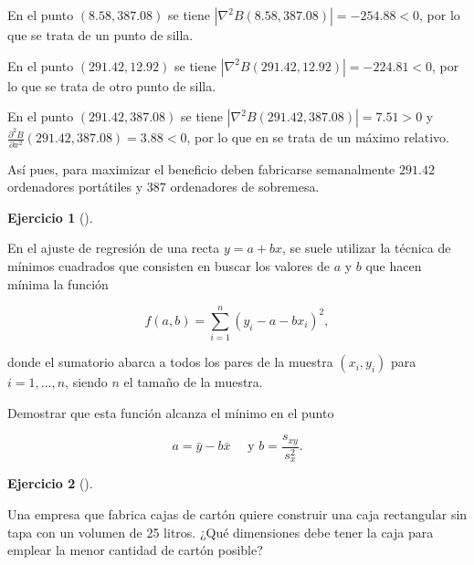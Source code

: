 \documentclass[
  a4paper,
]{scrreport}
\theoremstyle{definition}
\newtheorem{exercise}{Ejercicio}[chapter]
\theoremstyle{remark}
\begin{document}
\begin{tcolorbox}
En el punto \((8.58, 387.08)\) se tiene
\(|\nabla^2B(8.58, 387.08)| = -254.88 <0\), por lo que se trata de un
punto de silla.

En el punto \((291.42, 12.92)\) se tiene
\(|\nabla^2B(291.42, 12.92)| = -224.81 <0\), por lo que se trata de otro
punto de silla.

En el punto \((291.42, 387.08)\) se tiene
\(|\nabla^2B(291.42, 387.08)| = 7.51 >0\) y
\(\frac{\partial ^2 B}{\partial x^2}(291.42, 387.08)= 3.88<0\), por lo
que en se trata de un máximo relativo.

Así pues, para maximizar el beneficio deben fabricarse semanalmente
\(291.42\) ordenadores portátiles y \(387\) ordenadores de sobremesa.

\end{tcolorbox}

\begin{exercise}[]\protect\hypertarget{exr-ajuste-minimos-cuadrados}{}\label{exr-ajuste-minimos-cuadrados}

En el ajuste de regresión de una recta \(y=a+bx\), se suele utilizar la
técnica de mínimos cuadrados que consisten en buscar los valores de
\(a\) y \(b\) que hacen mínima la función

\[
f(a,b)= \sum_{i=1}^{n}(y_i-a-bx_i)^2,
\]

donde el sumatorio abarca a todos los pares de la muestra \((x_i,y_i)\)
para \(i=1,\ldots, n\), siendo \(n\) el tamaño de la muestra.

Demostrar que esta función alcanza el mínimo en el punto

\[
a=\bar y-b\bar x \quad \mbox{ y } b=\frac{s_{xy}}{s_x^2}.
\]

\end{exercise}

\begin{exercise}[]\protect\hypertarget{exr-minimización-material-caja}{}\label{exr-minimización-material-caja}

Una empresa que fabrica cajas de cartón quiere construir una caja
rectangular sin tapa con un volumen de 25 litros. ¿Qué dimensiones debe
tener la caja para emplear la menor cantidad de cartón posible?

\end{exercise}
\end{document}
